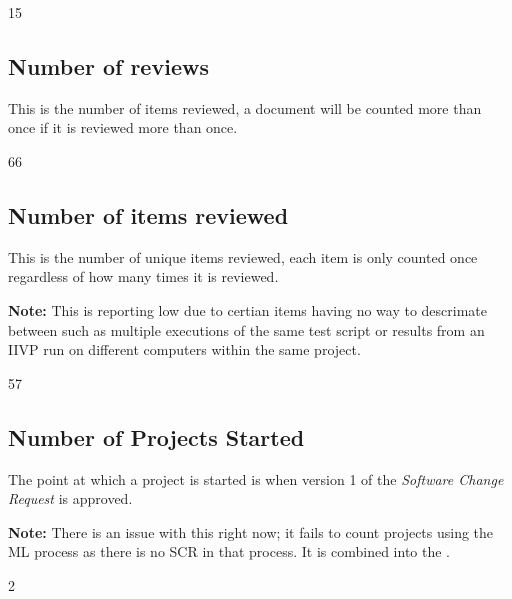 \documentclass{article}
\begin{document}
\begin{Schunk}
\begin{Soutput}
[1] 15
\end{Soutput}
\end{Schunk}

\subsection{Number of reviews}
This is the number of items reviewed, a document will be counted more than once
if it is reviewed more than once.

\begin{Schunk}
\begin{Soutput}
[1] 66
\end{Soutput}
\end{Schunk}

\subsection{Number of items reviewed}
This is the number of unique items reviewed, each item is only counted once
regardless of how many times it is reviewed.

\textbf{Note:} This is reporting low due to certian items having no way to
descrimate between such as multiple executions of the same test script or
results from an IIVP run on different computers within the same project.

\begin{Schunk}
\begin{Soutput}
[1] 57
\end{Soutput}
\end{Schunk}

\subsection{Number of Projects Started}
The point at which a project is started is when version 1 of the \textit{Software
Change Request} is approved.

\textbf{Note:} There is an issue with this right now; it fails to count projects using the ML process
as there is no SCR in that process. It is combined into the .

\begin{Schunk}
\begin{Soutput}
[1] 2
\end{Soutput}
\end{Schunk}
\end{document}
